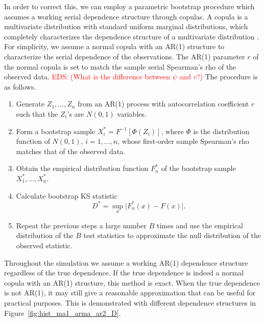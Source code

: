 \documentclass[12pt, letterpaper, titlepage]{article}
\newcommand{\eds}[1]{\textcolor{red}{EDS: (#1)}}
\begin{document}
In order to correct this, we can employ a parametric bootstrap procedure which
assumes a working serial dependence structure through copulas. A copula is a
multivariate distribution with standard uniform marginal distributions, which
completely characterizes the dependence structure of a multivariate
distribution \citep{Copula, Hofert}. For simplicity, we assume a normal copula
with an AR(1) structure to characterize the serial dependence of the
observations. The AR(1) parameter $r$ of the normal copula is set to match the
sample serial Spearman's rho of the observed data.
\eds{What is the difference between $\psi$ and $r$?}
The procedure is as
follows.

\begin{enumerate}
\item
  Generate $Z_1, \ldots, Z_n$ from an AR(1) process with autocorrelation
  coefficient $r$ such that the $Z_i$'s are $N(0, 1)$ variables.
\item
  Form a bootstrap sample $X_i^* = F^{-1} [\Phi(Z_i)]$, where $\Phi$ is the
  distribution function of $N(0, 1)$, $i = 1, \ldots, n$, whose first-order
  sample Spearman's rho matches that of the observed data.
\item
  Obtain the empirical distribution function $F_n^*$ of the bootstrap sample
  $X_1^*, \ldots, X_n^*$.
\item
  Calculate bootstrap KS statistic
  \[
    D^* = \sup_x \lvert F_n^* (x)- F(x) \rvert.
  \]
\item
  Repeat the previous steps a large number $B$ times and use the empirical
    distribution of the $B$ test statistics to approximate
    the null distribution of the observed statistic.
\end{enumerate}

Throughout the simulation we assume a working AR(1) dependence structure
regardless of the true dependence. If the true dependence is indeed a normal
copula with an AR(1) structure, this method is exact. When the true dependence
is not AR(1), it may still give a reasonable approximation that can be useful
for practical purposes. This is demonstrated with different dependence
structures in Figure~\ref{fig:hist_ma1_arma_ar2_D}.
\end{document}

